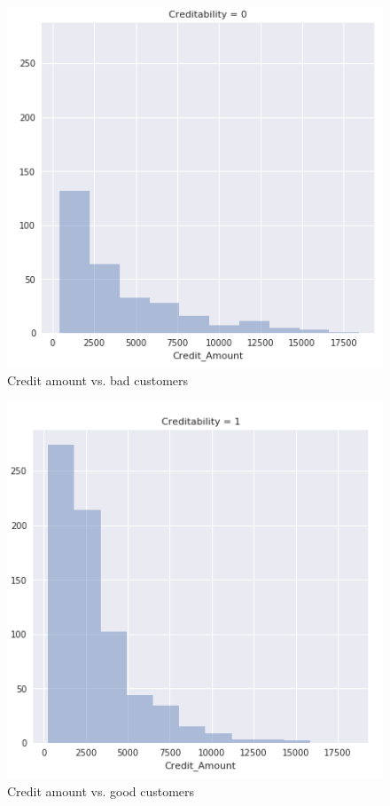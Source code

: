 \documentclass[sigconf]{acmart}
\begin{document}
\begin{figure}[htb]
  \centering
  \includegraphics[width=1.0\columnwidth]{images/Figure10.png}
  \caption{Credit amount vs. bad customers}
  \label{fig:Figure10} 
\end{figure}

\begin{figure}[htb]
  \centering
  \includegraphics[width=1.0\columnwidth]{images/Figure11.png}
  \caption{Credit amount vs. good customers}
  \label{fig:Figure11} 
\end{figure}
\end{document}
